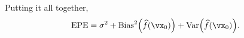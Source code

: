 \documentclass[12pt, answers]{exam}
\def\var{\text{Var}}
\def\fhat{\widehat{f}}
\begin{document}
\begin{solution}
Putting it all together,
\begin{align*}
\text{EPE}=\sigma^2+\text{Bias}^2\Big(\fhat(\vx_0)\Big)+\var\Big(\fhat(\vx_0)\Big).
\end{align*}


\end{solution}


\end{document}
